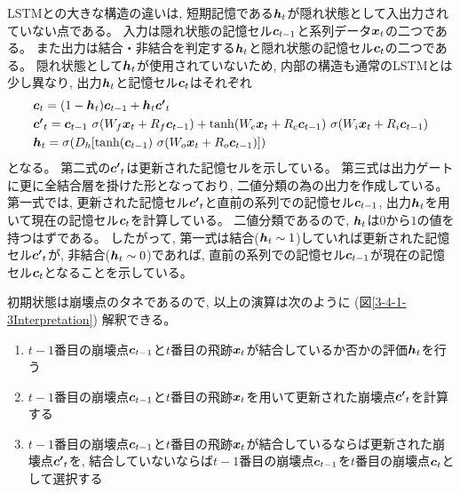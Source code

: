 LSTMとの大きな構造の違いは, 短期記憶である${\mbox{\boldmath{$h$}}}_t$が隠れ状態として入出力されていない点である。
入力は隠れ状態の記憶セル${\mbox{\boldmath{$c$}}}_{t-1}$と系列データ${\mbox{\boldmath{$x$}}}_t$の二つである。
また出力は結合・非結合を判定する${\mbox{\boldmath{$h$}}}_t$と隠れ状態の記憶セル${\mbox{\boldmath{$c$}}}_{t}$の二つである。
隠れ状態として${\mbox{\boldmath{$h$}}}_t$が使用されていないため, 内部の構造も通常のLSTMとは少し異なり, 出力${\mbox{\boldmath{$h$}}}_{t}$と記憶セル${\mbox{\boldmath{$c$}}}_{t}$はそれぞれ
\begin{equation}
 \begin{split}
  &{\mbox{\boldmath{$c$}}}_{t} 
  = (1-{\mbox{\boldmath{$h$}}}_t) {\mbox{\boldmath{$c$}}}_{t-1} + {\mbox{\boldmath{$h$}}}_t {\mbox{\boldmath{$c'$}}}_{t}\\
  &{\mbox{\boldmath{$c'$}}}_{t}
  = {\mbox{\boldmath{$c$}}}_{t-1} \  \sigma (W_f {\mbox{\boldmath{$x$}}}_t + R_f {\mbox{\boldmath{$c$}}}_{t-1}) 
  + \tanh (W_c {\mbox{\boldmath{$x$}}}_t + R_c {\mbox{\boldmath{$c$}}}_{t-1}) \  \sigma (W_i {\mbox{\boldmath{$x$}}}_t + R_i {\mbox{\boldmath{$c$}}}_{t-1})\\
  &{\mbox{\boldmath{$h$}}}_{t} 
  = \sigma (D_h [\tanh({\mbox{\boldmath{$c$}}}_{t-1}) \  \sigma (W_o {\mbox{\boldmath{$x$}}}_t + R_o {\mbox{\boldmath{$c$}}}_{t-1}) ])
 \end{split}
\end{equation}
となる。
第二式の${\mbox{\boldmath{$c'$}}}_{t}$は更新された記憶セルを示している。
第三式は出力ゲートに更に全結合層を掛けた形となっており, 二値分類の為の出力を作成している。
第一式では, 更新された記憶セル${\mbox{\boldmath{$c'$}}}_{t}$と直前の系列での記憶セル${\mbox{\boldmath{$c$}}}_{t-1}$, 出力${\mbox{\boldmath{$h$}}}_{t}$を用いて現在の記憶セル${\mbox{\boldmath{$c$}}}_{t}$を計算している。
二値分類であるので, ${\mbox{\boldmath{$h$}}}_{t}$は$0$から$1$の値を持つはずである。
したがって, 第一式は結合(${\mbox{\boldmath{$h$}}}_{t} \sim 1$)していれば更新された記憶セル${\mbox{\boldmath{$c'$}}}_{t}$が, 非結合(${\mbox{\boldmath{$h$}}}_{t} \sim 0$)であれば, 直前の系列での記憶セル${\mbox{\boldmath{$c$}}}_{t-1}$が現在の記憶セル${\mbox{\boldmath{$c$}}}_{t}$となることを示している。

初期状態は崩壊点のタネであるので, 以上の演算は次のように (図\ref{3-4-1-3Interpretation}) 解釈できる。

\begin{enumerate}
 \item $t-1$番目の崩壊点${\mbox{\boldmath{$c$}}}_{t-1}$と$t$番目の飛跡${\mbox{\boldmath{$x$}}}_{t}$が結合しているか否かの評価${\mbox{\boldmath{$h$}}}_{t}$を行う
 \item $t-1$番目の崩壊点${\mbox{\boldmath{$c$}}}_{t-1}$と$t$番目の飛跡${\mbox{\boldmath{$x$}}}_{t}$を用いて更新された崩壊点${\mbox{\boldmath{$c'$}}}_{t}$を計算する
 \item $t-1$番目の崩壊点${\mbox{\boldmath{$c$}}}_{t-1}$と$t$番目の飛跡${\mbox{\boldmath{$x$}}}_{t}$が結合しているならば更新された崩壊点${\mbox{\boldmath{$c'$}}}_{t}$を, 結合していないならば$t-1$番目の崩壊点${\mbox{\boldmath{$c$}}}_{t-1}$を$t$番目の崩壊点${\mbox{\boldmath{$c$}}}_{t}$として選択する
\end{enumerate}

